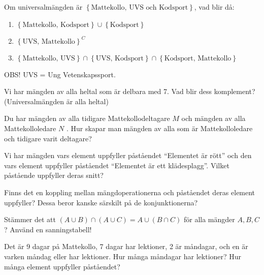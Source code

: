 \begin{problem}
	Om universalmängden är \(\left\{\text{Mattekollo, UVS och Kodsport} \right\}\), vad blir då:
	\begin{enumerate}[label=\alph*)]
		\item \(\left\{\text{Mattekollo, Kodsport} \right\} \cup \left\{\text{Kodsport} \right\}\) 
		\item \(\left\{\text{UVS, Mattekollo}\right\}^C\) 
		\item \(\left\{\text{Mattekollo, UVS}\right\} \cap \left\{\text{UVS, Kodsport} \right\} \cap \left\{\text{Kodsport, Mattekollo} \right\}\) 
	\end{enumerate}
	
	OBS! UVS = Ung Vetenskapssport.
\end{problem}

\begin{problem}
	Vi har mängden av alla heltal som är delbara med 7. Vad blir dess komplement? (Universalmängden är alla heltal)
\end{problem}

\begin{problem}
	Du har mängden av alla tidigare Mattekollodeltagare \(M\)  och mängden av alla Mattekolloledare \(N\) . Hur skapar man mängden av alla som är Mattekolloledare och tidigare varit deltagare?
\end{problem}

\begin{problem}
	Vi har mängden vars element uppfyller påståendet ``Elementet är rött'' och den vars element uppfyller påståendet ``Elementet är ett klädesplagg''. Vilket påstående uppfyller deras snitt?
\end{problem}

\begin{problem}
	Finns det en koppling mellan mängdoperationerna och påståendet deras element uppfyller? Dessa beror kanske särskilt på de konjunktionerna?
\end{problem}

\begin{problem}
	Stämmer det att \((A \cup B) \cap (A \cup C) = A \cup (B \cap C)\) för alla mängder \(A, B, C\)? Använd en sanningstabell!
\end{problem}

\begin{problem}[Extra]
	Det är 9 dagar på Mattekollo, 7 dagar har lektioner, 2 är måndagar, och en är varken måndag eller har lektioner. Hur många måndagar har lektioner?
	Hur många element uppfyller påståendet?
\end{problem}

